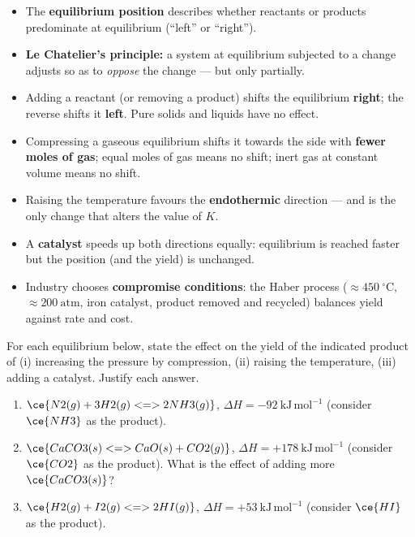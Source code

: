 \documentclass[11pt]{article}
\begin{document}
\begin{aretenir}
\begin{itemize}
\item The \textbf{equilibrium position} describes whether reactants or products predominate at equilibrium (``left'' or ``right'').
\item \textbf{Le Chatelier's principle:} a system at equilibrium subjected to a change adjusts so as to \emph{oppose} the change --- but only partially.
\item Adding a reactant (or removing a product) shifts the equilibrium \textbf{right}; the reverse shifts it \textbf{left}. Pure solids and liquids have no effect.
\item Compressing a gaseous equilibrium shifts it towards the side with \textbf{fewer moles of gas}; equal moles of gas means no shift; inert gas at constant volume means no shift.
\item Raising the temperature favours the \textbf{endothermic} direction --- and is the only change that alters the value of $K$.
\item A \textbf{catalyst} speeds up both directions equally: equilibrium is reached faster but the position (and the yield) is unchanged.
\item Industry chooses \textbf{compromise conditions}: the Haber process ($\approx 450\ ^{\circ}\mathrm{C}$, $\approx 200\ \mathrm{atm}$, iron catalyst, product removed and recycled) balances yield against rate and cost.
\end{itemize}
\end{aretenir}

\begin{exercice}
For each equilibrium below, state the effect on the yield of the indicated product of (i) increasing the pressure by compression, (ii) raising the temperature, (iii) adding a catalyst. Justify each answer.
\begin{enumerate}
\item $\ce{N2(g) + 3H2(g) <=> 2NH3(g)}$, $\Delta H = -92\ \mathrm{kJ\,mol^{-1}}$ (consider $\ce{NH3}$ as the product).
\item $\ce{CaCO3(s) <=> CaO(s) + CO2(g)}$, $\Delta H = +178\ \mathrm{kJ\,mol^{-1}}$ (consider $\ce{CO2}$ as the product). What is the effect of adding more $\ce{CaCO3(s)}$?
\item $\ce{H2(g) + I2(g) <=> 2HI(g)}$, $\Delta H = +53\ \mathrm{kJ\,mol^{-1}}$ (consider $\ce{HI}$ as the product).
\end{enumerate}
\end{exercice}
\end{document}
